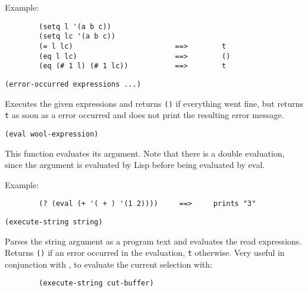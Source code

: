 Example:{\exemplefont\upspace\begin{verbatim}
        (setq l '(a b c))
        (setq lc '(a b c))
        (= l lc)                        ==>        t
        (eq l lc)                       ==>        ()
        (eq (# 1 l) (# 1 lc))           ==>        t
\end{verbatim}}


{\usagefont\begin{verbatim}
(error-occurred expressions ...)
\end{verbatim}}\usageupspace

Executes the given expressions and returns \verb"()" if everything went
fine, but returns \verb"t" as soon as a {\WOOL} error occurred and does not
print the resulting error message.

        
{\usagefont\begin{verbatim}
(eval wool-expression)
\end{verbatim}}\usageupspace

This function evaluates its argument. Note that there is a double evaluation,
since the argument is evaluated by Lisp before being evaluated by eval.

Example:{\exemplefont\upspace\begin{verbatim}
        (? (eval (+ '( + ) '(1 2))))     ==>     prints "3"
\end{verbatim}}

        
{\usagefont\begin{verbatim}
(execute-string string)
\end{verbatim}}\usageupspace

Parses the string argument as a {\WOOL} program text and evaluates the read
expressions. Returns \verb"()" if an error occurred in the evaluation,
\verb"t" otherwise. Very useful in conjunction with ,
to evaluate the current selection with:

{\exemplefont\begin{verbatim}
        (execute-string cut-buffer)
\end{verbatim}}

        
